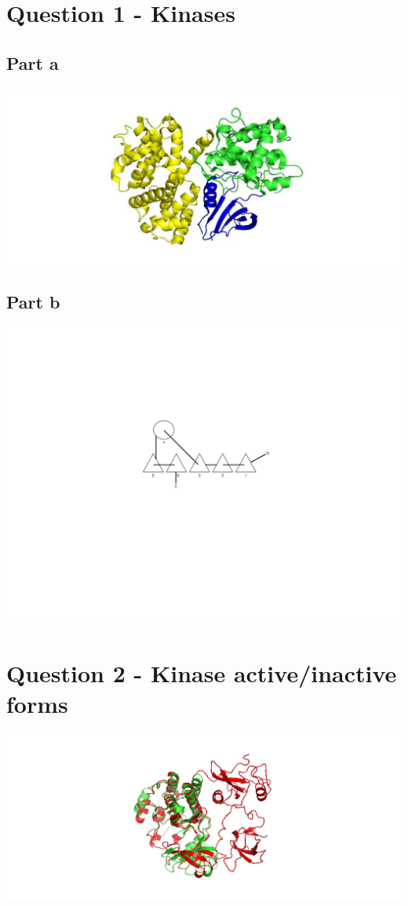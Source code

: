 \documentclass[11pt, a4paper,titlepage]{article}
\begin{document}
\setlength{\parskip}{0pt}%
\setlength{\parindent}{0pt}%
\renewcommand{\thesubsubsection}{\alph{subsubsection}.)}

\setcounter{tocdepth}{3}
\tableofcontents
\clearpage


\section{Question 1 - Kinases}
\subsection{Part a}
\includegraphics[width=15cm]{./Figures/1a.jpg}

\subsection{Part b}
\includegraphics[width=15cm]{./Figures/1b.pdf}

\section{Question 2 - Kinase active/inactive forms}
\includegraphics[width=15cm]{./Figures/2a.png}
\end{document}
